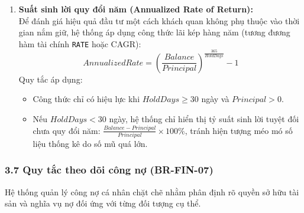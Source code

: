 \documentclass[11pt,a4paper]{article}
\providecommand{\tightlist}{
  \setlength{\itemsep}{0pt}\setlength{\parskip}{0pt}}
\begin{document}
\begin{enumerate}
  \begin{itemize}
  \tightlist
  \item
    Khi \(UnrealizedPL > 0\): Khoản đầu tư đang có lãi trên danh nghĩa.
  \item
    Khi \(UnrealizedPL < 0\): Khoản đầu tư đang chịu lỗ trên danh nghĩa.
  \end{itemize}
\item
  \textbf{Suất sinh lời quy đổi năm (Annualized Rate of Return):}\\
  Để đánh giá hiệu quả đầu tư một cách khách quan không phụ thuộc vào
  thời gian nắm giữ, hệ thống áp dụng công thức lãi kép hàng năm (tương
  đương hàm tài chính \texttt{RATE} hoặc CAGR):
  \[AnnualizedRate = \left(\frac{Balance}{Principal}\right)^{\frac{365}{HoldDays}} - 1\]
  Quy tắc áp dụng:

  \begin{itemize}
  \tightlist
  \item
    Công thức chỉ có hiệu lực khi \(HoldDays \ge 30\) ngày và
    \(Principal > 0\).
  \item
    Nếu \(HoldDays < 30\) ngày, hệ thống chỉ hiển thị tỷ suất sinh lời
    tuyệt đối chưa quy đổi năm:
    \(\frac{Balance - Principal}{Principal} \times 100\%\), tránh hiện
    tượng méo mó số liệu thống kê do số mũ quá lớn.
  \end{itemize}
\end{enumerate}

\newpage

\subsubsection{3.7 Quy tắc theo dõi công nợ
(BR-FIN-07)}\label{37-quy-tux1eafc-theo-duxf5i-cuxf4ng-nux1ee3-br-fin-07}

Hệ thống quản lý công nợ cá nhân chặt chẽ nhằm phân định rõ quyền sở hữu
tài sản và nghĩa vụ nợ đối ứng với từng đối tượng cụ thể.
\end{document}
